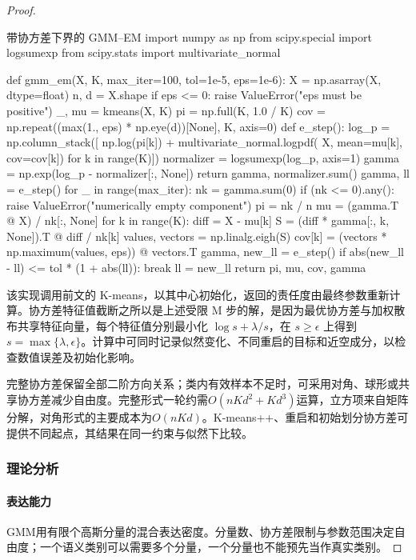 \begin{proof}
\begin{codeblock}[language=Python,label={code:clustering-gmm}]{带协方差下界的 GMM--EM}
import numpy as np
from scipy.special import logsumexp
from scipy.stats import multivariate_normal

def gmm_em(X, K, max_iter=100, tol=1e-5, eps=1e-6):
    X = np.asarray(X, dtype=float)
    n, d = X.shape
    if eps <= 0:
        raise ValueError("eps must be positive")
    _, mu = kmeans(X, K)
    pi = np.full(K, 1.0 / K)
    cov = np.repeat((max(1., eps) * np.eye(d))[None], K, axis=0)
    def e_step():
        log_p = np.column_stack([
            np.log(pi[k]) + multivariate_normal.logpdf(
                X, mean=mu[k], cov=cov[k])
            for k in range(K)])
        normalizer = logsumexp(log_p, axis=1)
        gamma = np.exp(log_p - normalizer[:, None])
        return gamma, normalizer.sum()
    gamma, ll = e_step()
    for _ in range(max_iter):
        nk = gamma.sum(0)
        if (nk <= 0).any():
            raise ValueError("numerically empty component")
        pi = nk / n
        mu = (gamma.T @ X) / nk[:, None]
        for k in range(K):
            diff = X - mu[k]
            S = (diff * gamma[:, k, None]).T @ diff / nk[k]
            values, vectors = np.linalg.eigh(S)
            cov[k] = (vectors * np.maximum(values, eps)) @ vectors.T
        gamma, new_ll = e_step()
        if abs(new_ll - ll) <= tol * (1 + abs(ll)):
            break
        ll = new_ll
    return pi, mu, cov, gamma
\end{codeblock}

该实现调用前文的 K-means，以其中心初始化，返回的责任度由最终参数重新计算。协方差特征值截断之所以是上述受限 M 步的解，是因为最优协方差与加权散布共享特征向量，每个特征值分别最小化 $\log s+\lambda/s$，在 $s\geq\epsilon$ 上得到 $s=\max\{\lambda,\epsilon\}$。计算中可同时记录似然变化、不同重启的目标和近空成分，以检查数值误差及初始化影响。

完整协方差保留全部二阶方向关系；类内有效样本不足时，可采用对角、球形或共享协方差减少自由度。完整形式一轮约需$O(nKd^2+Kd^3)$运算，立方项来自矩阵分解，对角形式的主要成本为$O(nKd)$。K-means++、重启和初始划分协方差可提供不同起点，其结果在同一约束与似然下比较。

\subsubsection{理论分析}

\paragraph{表达能力}
GMM用有限个高斯分量的混合表达密度。分量数、协方差限制与参数范围决定自由度；一个语义类别可以需要多个分量，一个分量也不能预先当作真实类别。


\end{proof}
